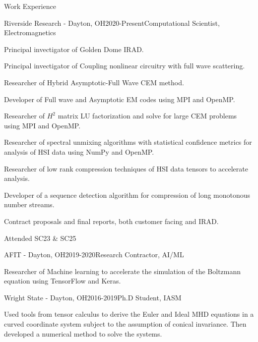 \documentclass{resume} %
\begin{document}
\begin{rSection}{Work Experience}

\begin{rSubsection}{Riverside Research - Dayton, OH}{2020-Present}{Computational Scientist, Electromagnetics}{}
\item Principal invectigator of Golden Dome IRAD.
\item Principal invectigator of Coupling nonlinear circuitry with full wave scattering.
\item Researcher of Hybrid Asymptotic-Full Wave CEM method.
\item Developer of Full wave and Asymptotic EM codes using MPI and OpenMP.
\item Researcher of $H^2$ matrix LU factorization and solve for large CEM problems using MPI and OpenMP.
\item Researcher of spectral unmixing algorithms with statistical confidence metrics for analysis of HSI data using NumPy and OpenMP.
\item Researcher of low rank compression techniques of HSI data tensors to accelerate analysis.
\item Developer of a sequence detection algorithm for compression of long monotonous number streams.
\item Contract proposals and final reports, both customer facing and IRAD.
\item Attended SC23 \& SC25
\end{rSubsection}

\begin{rSubsection}{AFIT - Dayton, OH}{2019-2020}{Research Contractor, AI/ML}{}
\item Researcher of Machine learning to accelerate the simulation of the Boltzmann equation using TensorFlow and Keras. 
\end{rSubsection}

\begin{rSubsection}{Wright State - Dayton, OH}{2016-2019}{Ph.D Student, IASM}{}
\item Used tools from tensor calculus to derive the Euler and Ideal MHD equations in a curved coordinate system subject to the assumption of conical invariance. Then developed a numerical method to solve the systems.
\end{rSubsection}


\end{rSection}
\end{document}
